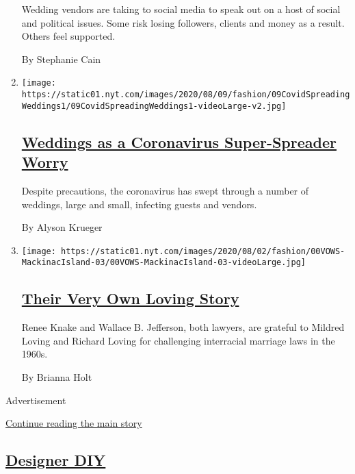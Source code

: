 \begin{enumerate}
  Wedding vendors are taking to social media to speak out on a host of
  social and political issues. Some risk losing followers, clients and
  money as a result. Others feel supported.

  By Stephanie Cain
\item
  \texttt{[image: https://static01.nyt.com/images/2020/08/09/fashion/09CovidSpreadingWeddings1/09CovidSpreadingWeddings1-videoLarge-v2.jpg]}

  \hypertarget{weddings-as-a-coronavirus-super-spreader-worry}{%
  \subsection{\texorpdfstring{\href{/2020/08/04/fashion/weddings/weddings-as-covid-super-spreaders.html}{Weddings
  as a Coronavirus Super-Spreader
  Worry}}{Weddings as a Coronavirus Super-Spreader Worry}}\label{weddings-as-a-coronavirus-super-spreader-worry}}

  Despite precautions, the coronavirus has swept through a number of
  weddings, large and small, infecting guests and vendors.

  By Alyson Krueger
\item
  \texttt{[image: https://static01.nyt.com/images/2020/08/02/fashion/00VOWS-MackinacIsland-03/00VOWS-MackinacIsland-03-videoLarge.jpg]}

  \hypertarget{their-very-own-loving-story}{%
  \subsection{\texorpdfstring{\href{/2020/07/31/fashion/weddings/Renee-Knake-and-Wallace-Jefferson-wed-tribute-to-Lovings-before-them.html}{Their
  Very Own Loving
  Story}}{Their Very Own Loving Story}}\label{their-very-own-loving-story}}

  Renee Knake and Wallace B. Jefferson, both lawyers, are grateful to
  Mildred Loving and Richard Loving for challenging interracial marriage
  laws in the 1960s.

  By Brianna Holt
\end{enumerate}

Advertisement

\protect\hyperlink{after-mid2}{Continue reading the main story}

\hypertarget{designer-diy}{%
\subsection{\texorpdfstring{\href{/issue/fashion/2020/06/19/designer-diy}{Designer
DIY}}{Designer DIY}}\label{designer-diy}}

